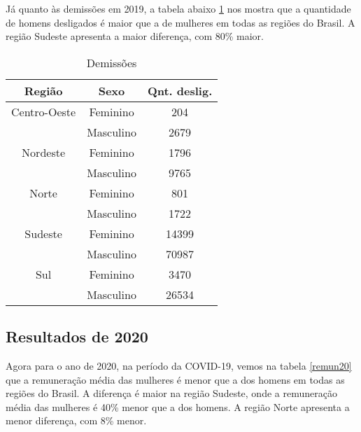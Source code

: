 Já quanto às demissões em 2019, a tabela abaixo \ref{demi} nos mostra que a quantidade de homens desligados é maior que a de mulheres em todas as regiões do Brasil. A região Sudeste apresenta a maior diferença, com 80\% maior.

\begin{table}[htbp]
	\caption{Demissões}
	\begin{center}
		\begin{tabular}{|c|c|c|}
			\hline
			\textbf{Região} & \textbf{Sexo} & \textbf{Qnt. deslig.} \\ 
			\hline																
			Centro-Oeste     & Feminino      & 204                   \\
			                 & Masculino     & 2679                  \\
			\hline
			Nordeste         & Feminino      & 1796                  \\
			                 & Masculino     & 9765                  \\
			\hline
			Norte            & Feminino      & 801                   \\
			                 & Masculino     & 1722                  \\
			\hline
			Sudeste          & Feminino      & 14399                 \\
			                 & Masculino     & 70987                 \\
			\hline
			Sul              & Feminino      & 3470                  \\
			                 & Masculino     & 26534                 \\
			\hline
		\end{tabular}
		\label{demi}
	\end{center}
\end{table}
  

\subsection{Resultados de 2020}

Agora para o ano de 2020, na período da COVID-19, vemos na tabela  \ref{remun20} que a remuneração média das mulheres é menor que a dos homens em todas as regiões do Brasil. A diferença é maior na região Sudeste, onde a remuneração média das mulheres é 40\% menor que a dos homens. A região Norte apresenta a menor diferença, com 8\% menor.

